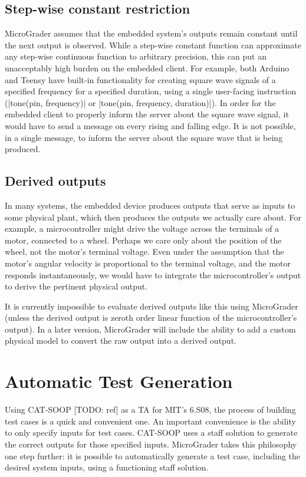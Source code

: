 \documentclass[12pt]{article}
\begin{document}
\subsection{Step-wise constant restriction}
MicroGrader assumes that the embedded system's outputs remain constant until the next output is observed.  While a step-wise constant function can approximate any step-wise continuous function to arbitrary precision, this can put an unacceptably high burden on the embedded client.  For example, both Arduino and Teensy have built-in functionality for creating square wave signals of a specified frequency for a specified duration, using a single user-facing instruction (|tone(pin, frequency)| or |tone(pin, frequency, duration)|).  In order for the embedded client to properly inform the server about the square wave signal, it would have to send a message on every rising and falling edge.  It is not possible, in a single message, to inform the server about the square wave that is being produced.

\subsection{Derived outputs}
In many systems, the embedded device produces outputs that serve as inputs to some physical plant, which then produces the outputs we actually care about.  For example, a microcontroller might drive the voltage across the terminals of a motor, connected to a wheel.  Perhaps we care only about the position of the wheel, not the motor's terminal voltage.  Even under the assumption that the motor's angular velocity is proportional to the terminal voltage, and the motor responds instantaneously, we would have to integrate the microcontroller's output to derive the pertinent physical output.

It is currently impossible to evaluate derived outputs like this using MicroGrader (unless the derived output is zeroth order linear function of the microcontroller's output).  In a later version, MicroGrader will include the ability to add a custom physical model to convert the raw output into a derived output.

\newpage
\section{Automatic Test Generation}
\label{sec:scaffold}

Using CAT-SOOP [TODO: ref] as a TA for MIT's 6.S08, the process of building test cases is a quick and convenient one.  An important convenience is the ability to only specify inputs for test cases.  CAT-SOOP uses a staff solution to generate the correct outputs for those specified inputs.  MicroGrader takes this philosophy one step further: it is possible to automatically generate a test case, including the desired system inputs, using a functioning staff solution.
\end{document}
